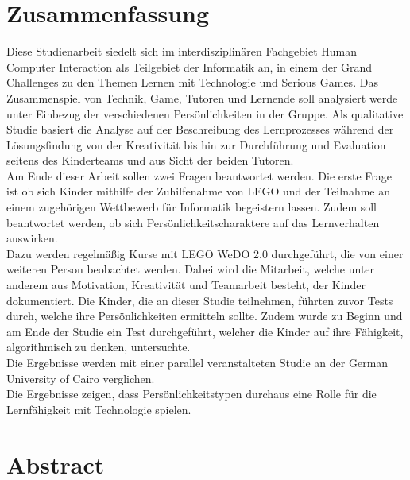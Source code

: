 \section*{Zusammenfassung}

Diese Studienarbeit siedelt sich im interdisziplinären Fachgebiet Human Computer Interaction als Teilgebiet der Informatik an, in einem der Grand Challenges zu den Themen Lernen mit Technologie und Serious Games. Das Zusammenspiel von Technik, Game, Tutoren und Lernende soll analysiert werde unter Einbezug der verschiedenen Persönlichkeiten in der Gruppe. Als qualitative Studie basiert die Analyse auf der Beschreibung des Lernprozesses während der Lösungsfindung von der Kreativität bis hin zur Durchführung und Evaluation seitens des Kinderteams und aus Sicht der beiden Tutoren.\\
Am Ende dieser Arbeit sollen zwei Fragen beantwortet werden. Die erste Frage ist ob sich Kinder mithilfe der Zuhilfenahme von LEGO und der Teilnahme an einem zugehörigen Wettbewerb für Informatik begeistern lassen. Zudem soll beantwortet werden, ob sich Persönlichkeitscharaktere auf das Lernverhalten auswirken.\\
Dazu werden regelmäßig Kurse mit LEGO WeDO 2.0 durchgeführt, die von einer weiteren Person beobachtet werden. Dabei wird die Mitarbeit, welche unter anderem aus Motivation, Kreativität und Teamarbeit besteht, der Kinder dokumentiert. Die Kinder, die an dieser Studie teilnehmen, führten zuvor Tests durch, welche ihre Persönlichkeiten ermitteln sollte. Zudem wurde zu Beginn und am Ende der Studie ein Test durchgeführt, welcher die Kinder auf ihre Fähigkeit, algorithmisch zu denken, untersuchte.\\
Die Ergebnisse werden mit einer parallel veranstalteten Studie an der German University of Cairo verglichen.\\
Die Ergebnisse zeigen, dass Persönlichkeitstypen durchaus eine Rolle für die Lernfähigkeit mit Technologie spielen.\\

\clearpage
\section*{Abstract}

